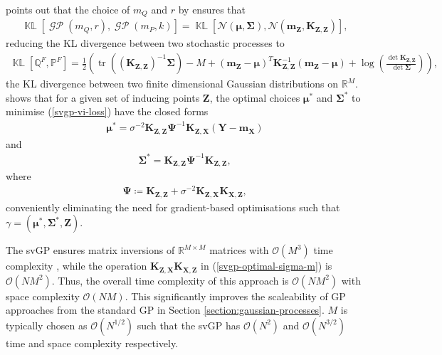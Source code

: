 \documentclass{article}
\newcommand{\KLD}{\operatorname{\mathbb{KL}}}
\newcommand{\tr}{\operatorname{tr}}
\newcommand{\GP}{\operatorname{\mathcal{GP}}}
\numberwithin{equation}{section}
\begin{document}
\cite{matthews2016sparse} points out that the choice of $m_Q$ and $r$ by \cite{titsias2009variational} ensures that
\begin{align}
    \KLD\left[\GP\left(m_Q, r\right), \GP\left(m_P, k\right)\right] = \KLD\left[\mathcal{N}\left(\boldsymbol{\mu}, \mathbf{\Sigma}\right), \mathcal{N}\left(\mathbf{m}_{\mathbf{Z}}, \mathbf{K}_{\mathbf{Z}, \mathbf{Z}}\right)\right],
\end{align}
reducing the KL divergence between two stochastic processes to
\begin{align}
        \KLD\left[\mathbb{Q}^F, \mathbb{P}^F\right]
    = \frac{1}{2}\left( \tr\left(\left(\mathbf{K}_{\mathbf{Z}, \mathbf{Z}}\right)^{-1} \boldsymbol{\Sigma}\right) - M +
    \left(\mathbf{m}_{\mathbf{Z}} - \boldsymbol{\mu}\right)^T \mathbf{K}_{\mathbf{Z}, \mathbf{Z}}^{-1} \left(\mathbf{m}_{\mathbf{Z}} - \boldsymbol{\mu}\right)+ \log\left(\frac{\det\mathbf{K}_{\mathbf{Z}, \mathbf{Z}}}{\det\boldsymbol{\Sigma}}\right) \right),
    \label{kld-closed-form}
\end{align}
the KL divergence between two finite dimensional Gaussian distributions on $\mathbb{R}^M$.
\cite{titsias2009variational} shows that for a given set of inducing points $\mathbf{Z}$, the optimal choices $\boldsymbol{\mu}^*$ and $\mathbf{\Sigma}^*$ to minimise (\ref{svgp-vi-loss}) have the closed forms
\begin{align}
    \label{svgp-optimal-mean}
    \boldsymbol{\mu}^* = \sigma^{-2}\mathbf{K}_{\mathbf{Z}, \mathbf{Z}} \mathbf{\Psi}^{-1}\mathbf{K}_{\mathbf{Z}, \mathbf{X}}  \left(\mathbf{Y} - \mathbf{m}_\mathbf{X}\right)
\end{align}
and
\begin{align}
    \label{svgp-optimal-covariance}
    \mathbf{\Sigma}^* = \mathbf{K}_{\mathbf{Z}, \mathbf{Z}}  \mathbf{\Psi}^{-1}\mathbf{K}_{\mathbf{Z}, \mathbf{Z}},
\end{align}
where
\begin{align}
    \mathbf{\Psi} \coloneqq \mathbf{K}_{\mathbf{Z}, \mathbf{Z}}  + \sigma^{-2}\mathbf{K}_{\mathbf{Z}, \mathbf{X}} \mathbf{K}_{\mathbf{X}, \mathbf{Z}},
    \label{svgp-optimal-sigma-m}
\end{align}
conveniently eliminating the need for gradient-based optimisations such that $\gamma = \left(\boldsymbol{\mu}^*, \mathbf{\Sigma}^*,  \mathbf{Z}\right)$.

The svGP ensures matrix inversions of $\mathbb{R}^{M \times M}$ matrices with $\mathcal{O}\left(M^3\right)$ time complexity , while the operation $\mathbf{K}_{\mathbf{Z}, \mathbf{X}} \mathbf{K}_{\mathbf{X}, \mathbf{Z}}$ in (\ref{svgp-optimal-sigma-m}) is $\mathcal{O}\left(NM^2\right)$.
Thus, the overall time complexity  of this approach is $\mathcal{O}\left(NM^2\right)$ with space complexity $\mathcal{O}\left(NM\right)$.
This significantly improves the scaleability of GP approaches from the standard GP in Section \ref{section:gaussian-processes}. $M$ is typically chosen as $\mathcal{O}(N^{1/2})$ such that the svGP has $\mathcal{O}(N^{2})$ and $\mathcal{O}(N^{3/2})$ time and space complexity respectively.
\end{document}
